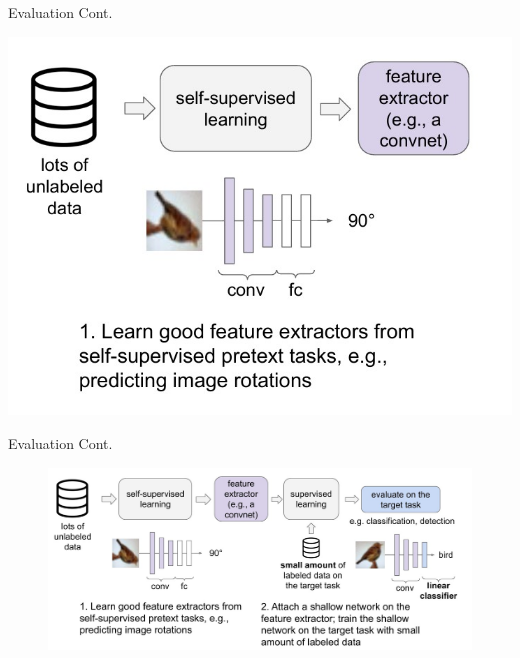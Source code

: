\documentclass[serif, aspectratio=169]{beamer}
\begin{document}





\begin{frame}{Evaluation Cont.}
        
     \begin{flushleft}
           \includegraphics[keepaspectratio, scale=0.5]{pic/Evaluation-1.jpg}
\end{flushleft}
  
\end{frame}


\begin{frame}{Evaluation Cont.}
        \begin{figure}[htpb]
   
           \includegraphics[keepaspectratio, scale=0.5]{pic/Evaluation-2.jpg}

    \end{figure}
\end{frame}
\end{document}
